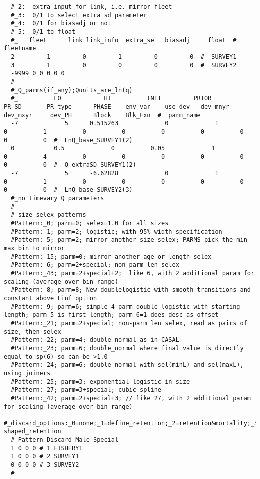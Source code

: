 \begin{landscape}
{\begin{verbatim}
  #_2:  extra input for link, i.e. mirror fleet
  #_3:  0/1 to select extra sd parameter
  #_4:  0/1 for biasadj or not
  #_5:  0/1 to float
  #_   fleet      link link_info  extra_se   biasadj     float  #  fleetname
  2         1         0         1         0         0  #  SURVEY1
  3         1         0         0         0         0  #  SURVEY2
  -9999 0 0 0 0 0
  #
  #_Q_parms(if_any);Qunits_are_ln(q)
  #_          LO            HI          INIT         PRIOR         PR_SD       PR_type      PHASE    env-var    use_dev   dev_mnyr   dev_mxyr     dev_PH      Block    Blk_Fxn  #  parm_name
  -7             5      0.515263             0             1             0          1          0          0          0          0          0          0          0  #  LnQ_base_SURVEY1(2)
  0           0.5             0          0.05             1             0         -4          0          0          0          0          0          0          0  #  Q_extraSD_SURVEY1(2)
  -7             5      -6.62828             0             1             0          1          0          0          0          0          0          0          0  #  LnQ_base_SURVEY2(3)
  #_no timevary Q parameters
  #
  #_size_selex_patterns
  #Pattern:_0; parm=0; selex=1.0 for all sizes
  #Pattern:_1; parm=2; logistic; with 95% width specification
  #Pattern:_5; parm=2; mirror another size selex; PARMS pick the min-max bin to mirror
  #Pattern:_15; parm=0; mirror another age or length selex
  #Pattern:_6; parm=2+special; non-parm len selex
  #Pattern:_43; parm=2+special+2;  like 6, with 2 additional param for scaling (average over bin range)
  #Pattern:_8; parm=8; New doublelogistic with smooth transitions and constant above Linf option
  #Pattern:_9; parm=6; simple 4-parm double logistic with starting length; parm 5 is first length; parm 6=1 does desc as offset
  #Pattern:_21; parm=2+special; non-parm len selex, read as pairs of size, then selex
  #Pattern:_22; parm=4; double_normal as in CASAL
  #Pattern:_23; parm=6; double_normal where final value is directly equal to sp(6) so can be >1.0
  #Pattern:_24; parm=6; double_normal with sel(minL) and sel(maxL), using joiners
  #Pattern:_25; parm=3; exponential-logistic in size
  #Pattern:_27; parm=3+special; cubic spline 
  #Pattern:_42; parm=2+special+3; // like 27, with 2 additional param for scaling (average over bin range)
  #_discard_options:_0=none;_1=define_retention;_2=retention&mortality;_3=all_discarded_dead;_4=define_dome-shaped_retention
  #_Pattern Discard Male Special
  1 0 0 0 # 1 FISHERY1
  1 0 0 0 # 2 SURVEY1
  0 0 0 0 # 3 SURVEY2
  #

\end{verbatim}}
\end{landscape}
